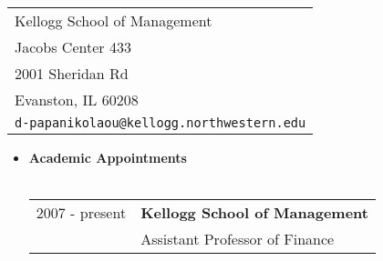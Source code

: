 \documentclass[11pt,letterpaper,overlapped]{res}
\begin{document}

\setlength{\leftmargini}{0em}
\renewcommand{\labelitemi}{}

\renewcommand{\namefont}{\large\textbf}



\begin{resume}

\begin{tabular}{l}
  Kellogg School of Management            \\
  Jacobs Center 433           \\
  2001 Sheridan Rd                         \\
  Evanston, IL 60208               \\
  {\tt d-papanikolaou@kellogg.northwestern.edu}  \\
\end{tabular}
\vspace{1.5cm}
\begin{itemize}

\item \textbf{Academic Appointments}\\
\\
\begin{tabular}{ll}
2007 - present & \textbf{Kellogg School of Management}\\
& Assistant Professor of Finance\\[0.2cm]
\end{tabular}

\vspace{0.6cm}



\end{itemize}
\end{resume}
\end{document}
